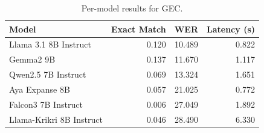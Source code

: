 \begin{table}[t]
\centering
\caption{Per-model results for GEC.}
\label{tab:appendix-gec-analysis}
\begin{tabular}{lrrr}
\toprule
Model & Exact Match & WER & Latency (s) \\
\midrule
Llama 3.1 8B Instruct & 0.120 & 10.489 & 0.822 \\
Gemma2 9B & 0.137 & 11.670 & 1.117 \\
Qwen2.5 7B Instruct & 0.069 & 13.324 & 1.651 \\
Aya Expanse 8B & 0.057 & 21.025 & 0.772 \\
Falcon3 7B Instruct & 0.006 & 27.049 & 1.892 \\
Llama-Krikri 8B Instruct & 0.046 & 28.490 & 6.330 \\
\bottomrule
\end{tabular}
\end{table}
